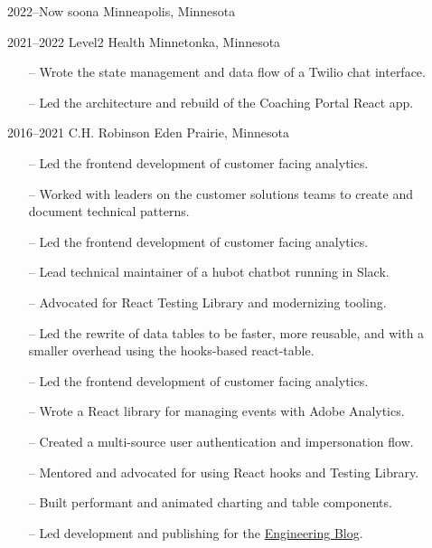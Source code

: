 \documentclass[]{cv-style} %
\begin{document}
\begin{entrylist}


\entry
{2022--Now}
{soona}
{Minneapolis, Minnesota}
{}

\entry
{2021--2022}
{Level2 Health}
{Minnetonka, Minnesota}
{
\begin{itemize}
    \item[--] Wrote the state management and data flow of a Twilio chat interface.
    \item[--] Led the architecture and rebuild of the Coaching Portal React app.
\end{itemize}}

\entry
{2016--2021}
{C.H. Robinson}
{Eden Prairie, Minnesota}
{
\begin{itemize}
    \item[--] Led the frontend development of customer facing analytics.
    \item[--] Worked with leaders on the customer solutions teams to create and document technical patterns.
\end{itemize}

\begin{itemize}
    \item[--] Led the frontend development of customer facing analytics.
    \item[--] Lead technical maintainer of a hubot chatbot running in Slack.
    \item[--] Advocated for React Testing Library and modernizing tooling.
    \item[--] Led the rewrite of data tables to be faster, more reusable, and with a smaller overhead using the hooks-based react-table.
\end{itemize}

\begin{itemize}
    \item[--] Led the frontend development of customer facing analytics.
    \item[--] Wrote a React library for managing events with Adobe Analytics.
    \item[--] Created a multi-source user authentication and impersonation flow.
    \item[--] Mentored and advocated for using React hooks and Testing Library.
    \item[--] Built performant and animated charting and table components.
    \item[--] Led development and publishing for the \href{https://engineering.chrobinson.com}{Engineering Blog}.
\end{itemize}

}
\end{entrylist}
\end{document}
